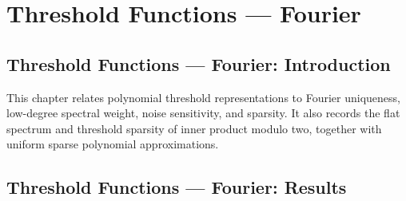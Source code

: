 \section{Threshold Functions --- Fourier}
\subsection*{Threshold Functions --- Fourier: Introduction}
This chapter relates polynomial threshold representations to Fourier uniqueness, low-degree spectral weight, noise sensitivity, and sparsity. It also records the flat spectrum and threshold sparsity of inner product modulo two, together with uniform sparse polynomial approximations.
\subsection*{Threshold Functions --- Fourier: Results}


